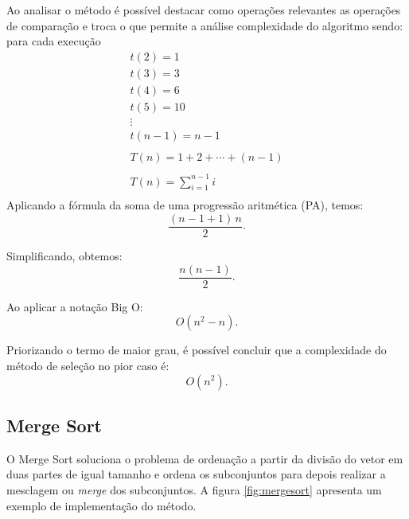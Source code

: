 \documentclass[
	article,			%
	11pt,				%
	oneside,			%
	a4paper,			%
	english,			%
	brazil,				%
	sumario=tradicional
	]{abntex2}
\begin{document}
Ao analisar o método é possível destacar como operações relevantes as operações de comparação e troca o que permite a análise complexidade do algoritmo sendo:
para cada execução 
\begin{equation}
\begin{gathered}
t(2) =  1 \\
t(3) = 3 \\
t(4) = 6 \\
t(5) = 10 \\
\vdots \\
t(n-1) = n -1  \\
\\
T(n) = 1 + 2 + \cdots + (n - 1) \\
\\
T(n) = \sum_{i=1}^{n-1} i \\
\end{gathered}
\end{equation}
Aplicando a fórmula da soma de uma progressão aritmética (PA), temos:
\[
\frac{(n-1 + 1)\,n}{2}.
\]

Simplificando, obtemos:
\[
\frac{n(n-1)}{2}.
\]

Ao aplicar a notação Big O:
\[
O(n^2 - n).
\]

Priorizando o termo de maior grau, é possível concluir que a complexidade do método de seleção no pior caso é:
\[
O(n^2).
\]

\subsection{Merge Sort}

O Merge Sort soluciona o problema de ordenação a partir da divisão do vetor em duas partes de igual tamanho e ordena os subconjuntos para depois realizar a mesclagem ou \textit{merge} dos subconjuntos. A figura \ref{fig:mergesort} apresenta um exemplo de implementação do método.
\end{document}
